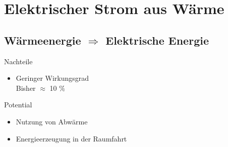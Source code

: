 
\section{Elektrischer Strom aus Wärme}




\subsection{Wärmeenergie $\Rightarrow$ Elektrische Energie}
\begin{frame}
\begin{block}{Nachteile}
  \begin{itemize}
    \item Geringer Wirkungsgrad\\
          Bisher $\approx$ 10 \%
  \end{itemize}
\end{block}
\begin{block}{Potential}
  \begin{itemize}
    \item Nutzung von Abwärme
    \item Energieerzeugung in der Raumfahrt
  \end{itemize}
\end{block}
\end{frame}

